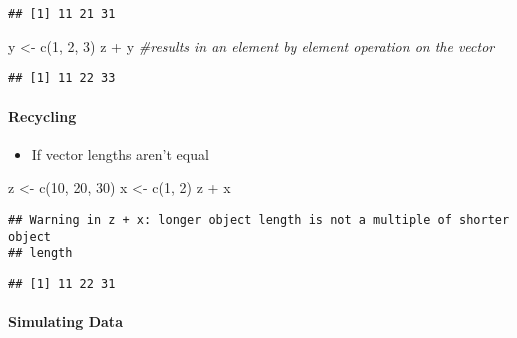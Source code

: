 \documentclass[
]{article}
\newenvironment{Shaded}{\begin{snugshade}}{\end{snugshade}}
\newcommand{\CommentTok}[1]{\textcolor[rgb]{0.56,0.35,0.01}{\textit{#1}}}
\newcommand{\DecValTok}[1]{\textcolor[rgb]{0.00,0.00,0.81}{#1}}
\newcommand{\FunctionTok}[1]{\textcolor[rgb]{0.00,0.00,0.00}{#1}}
\newcommand{\NormalTok}[1]{#1}
\newcommand{\OtherTok}[1]{\textcolor[rgb]{0.56,0.35,0.01}{#1}}
\newcommand{\SpecialCharTok}[1]{\textcolor[rgb]{0.00,0.00,0.00}{#1}}
\providecommand{\tightlist}{%
  \setlength{\itemsep}{0pt}\setlength{\parskip}{0pt}}
\begin{document}
\begin{verbatim}
## [1] 11 21 31
\end{verbatim}

\begin{Shaded}
\begin{Highlighting}[]
\NormalTok{y }\OtherTok{\textless{}{-}} \FunctionTok{c}\NormalTok{(}\DecValTok{1}\NormalTok{, }\DecValTok{2}\NormalTok{, }\DecValTok{3}\NormalTok{)}
\NormalTok{z }\SpecialCharTok{+}\NormalTok{ y }\CommentTok{\#results in an element by element operation on the vector}
\end{Highlighting}
\end{Shaded}

\begin{verbatim}
## [1] 11 22 33
\end{verbatim}

\hypertarget{recycling}{%
\paragraph{Recycling}\label{recycling}}

\begin{itemize}
\tightlist
\item
  If vector lengths aren't equal
\end{itemize}

\begin{Shaded}
\begin{Highlighting}[]
\NormalTok{z }\OtherTok{\textless{}{-}} \FunctionTok{c}\NormalTok{(}\DecValTok{10}\NormalTok{, }\DecValTok{20}\NormalTok{, }\DecValTok{30}\NormalTok{)}
\NormalTok{x }\OtherTok{\textless{}{-}} \FunctionTok{c}\NormalTok{(}\DecValTok{1}\NormalTok{, }\DecValTok{2}\NormalTok{)}
\NormalTok{z }\SpecialCharTok{+}\NormalTok{ x}
\end{Highlighting}
\end{Shaded}

\begin{verbatim}
## Warning in z + x: longer object length is not a multiple of shorter object
## length
\end{verbatim}

\begin{verbatim}
## [1] 11 22 31
\end{verbatim}

\hypertarget{simulating-data}{%
\paragraph{Simulating Data}\label{simulating-data}}
\end{document}
